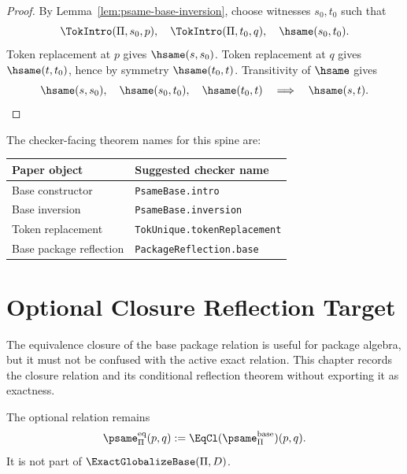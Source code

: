 \begin{proof}
By Lemma~\ref{lem:psame-base-inversion}, choose witnesses \(s_0,t_0\) such that
$$
  \TokIntro(\Pi,s_0,p),\quad \TokIntro(\Pi,t_0,q),\quad \hsame(s_0,t_0).
$$
Token replacement at \(p\) gives \(\hsame(s,s_0)\). Token replacement at \(q\) gives \(\hsame(t,t_0)\), hence by symmetry \(\hsame(t_0,t)\). Transitivity of \(\hsame\) gives
$$
  \hsame(s,s_0),\quad \hsame(s_0,t_0),\quad \hsame(t_0,t)
  \quad\Longrightarrow\quad \hsame(s,t).
$$
\end{proof}

\begin{protocol}
\label{prot:public-base-reflection-names}
The checker-facing theorem names for this spine are:
\begin{center}
\begin{tabular}{ll}
\toprule
\textbf{Paper object} & \textbf{Suggested checker name}\\
\midrule
Base constructor & \texttt{PsameBase.intro}\\
Base inversion & \texttt{PsameBase.inversion}\\
Token replacement & \texttt{TokUnique.tokenReplacement}\\
Base package reflection & \texttt{PackageReflection.base}\\
\bottomrule
\end{tabular}
\end{center}
\end{protocol}

\section{Optional Closure Reflection Target}
\label{sec:po-closure-reflection-target}

The equivalence closure of the base package relation is useful for package algebra, but it must not be confused with the active exact relation. This chapter records the closure relation and its conditional reflection theorem without exporting it as exactness.

\begin{definition}
\label{def:psame-eq-target}
The optional relation remains
$$
  \psame_{\Pi}^{\mathrm{eq}}(p,q) := \EqCl(\psame_{\Pi}^{\mathrm{base}})(p,q).
$$
It is not part of \(\ExactGlobalizeBase(\Pi,D)\).
\end{definition}

